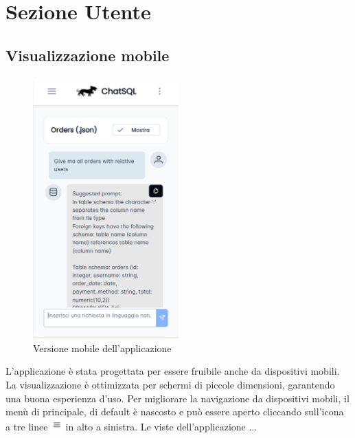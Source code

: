 \section{Sezione Utente}
\label{sec:sezUtente}

\subsection{Visualizzazione mobile}
\begin{figure}[H]
  \centering
  \includegraphics[width=0.50\textwidth]{assets/mobile.png}
  \caption{Versione mobile dell'applicazione}
\end{figure}
\par L'applicazione è stata progettata per essere fruibile anche da dispositivi mobili. La visualizzazione è ottimizzata per schermi di piccole dimensioni, garantendo una buona esperienza d'uso.
Per migliorare la navigazione da dispositivi mobili, il menù di principale, di default è nascosto e può essere aperto cliccando sull'icona a tre linee \includegraphics[height=1.2em]{assets/dd_burger_menu.png} in alto a sinistra.
Le viste dell'applicazione ...